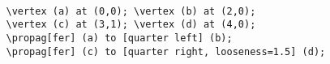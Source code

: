 \documentclass[10pt,letterpaper,twoside,notitlepage]{article}
\numberwithin{figure}{section}
\begin{document}
\\
\begin{minipage}{0.7\linewidth}
\vercol\begin{verbatim}
   \vertex (a) at (0,0); \vertex (b) at (2,0);
   \vertex (c) at (3,1); \vertex (d) at (4,0);
   \propag[fer] (a) to [quarter left] (b);
   \propag[fer] (c) to [quarter right, looseness=1.5] (d);
\end{verbatim}\txcol
\end{minipage}
%
\begin{minipage}{0.25\linewidth}
\end{minipage}
%
\vspace{-6mm}
\end{document}
